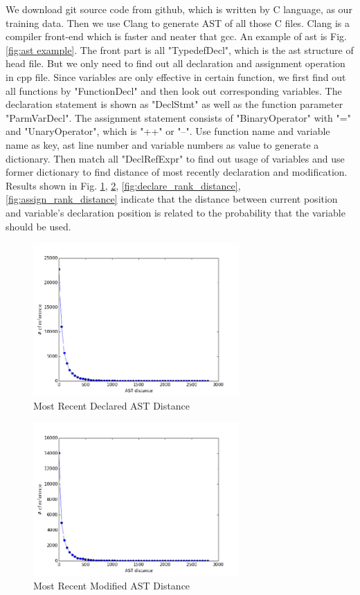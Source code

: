 \documentclass[prodmode,acmtecs]{acmsmall} %
\begin{document}
We download git source code from github, which is written by C language, as our training data. Then we use Clang to generate AST of all those C files. Clang is a compiler front-end which is faster and neater that gcc. An example of ast is Fig. \ref{fig:ast example}. The front part is all "TypedefDecl", which is the ast structure of head file. But we only need to find out all declaration and assignment operation in cpp file. Since variables are only effective in certain function, we first find out all functions by "FunctionDecl" and then look out corresponding variables. The declaration statement is shown as "DeclStmt" as well as the function parameter "ParmVarDecl". The assignment statement consists of "BinaryOperator" with "=" and "UnaryOperator", which is "++" or "--". Use function name and variable name as key, ast line number and variable numbers as value to generate a dictionary. Then match all "DeclRefExpr" to find out usage of variables and use former dictionary to find distance of most recently declaration and modification. Results shown in Fig. \ref{fig:declare_ast_distance}, \ref{fig:assign_ast_distance}, \ref{fig:declare_rank_distance}, \ref{fig:assign_rank_distance} indicate that the distance between current position and variable's declaration position is related to the probability that the variable should be used.

\begin{figure}
\centerline{\includegraphics[width=0.7\textwidth]{declare_ast_distance}}
\caption{Most Recent Declared AST Distance}
\label{fig:declare_ast_distance}
\end{figure}
                                                           
\begin{figure}
\centerline{\includegraphics[width=0.7\textwidth]{assign_ast_distance}}
\caption{Most Recent Modified AST Distance}
\label{fig:assign_ast_distance}
\end{figure}
\end{document}
